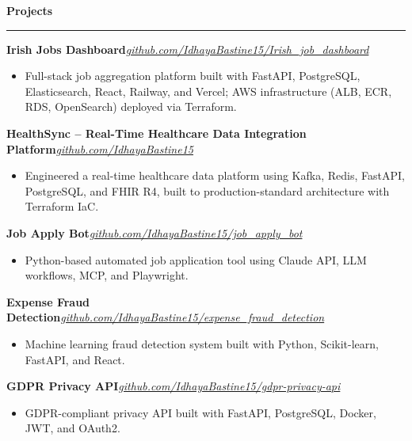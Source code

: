 \documentclass[10pt,letterpaper]{article}
\newcommand{\ressection}[1]{%
  \vspace{4pt}%
  {\large\textbf{#1}}\\[-5pt]%
  \rule{\linewidth}{0.5pt}\par%
  \vspace{2pt}%
}
\newcommand{\jobtitle}[2]{%
  \vspace{3pt}%
  \noindent\textbf{#1}\hfill\textit{#2}\par%
}
\begin{document}
\ressection{Projects}

\jobtitle{Irish Jobs Dashboard}{\href{https://github.com/IdhayaBastine15/Irish_job_dashboard}{github.com/IdhayaBastine15/Irish\_job\_dashboard}}
\begin{itemize}[leftmargin=12pt, label=\textbullet, itemsep=1pt, topsep=0pt, parsep=0pt]
  \item Full-stack job aggregation platform built with FastAPI, PostgreSQL, Elasticsearch, React, Railway, and Vercel; AWS infrastructure (ALB, ECR, RDS, OpenSearch) deployed via Terraform.
\end{itemize}

\vspace{2pt}

\jobtitle{HealthSync -- Real-Time Healthcare Data Integration Platform}{\href{https://github.com/IdhayaBastine15}{github.com/IdhayaBastine15}}
\begin{itemize}[leftmargin=12pt, label=\textbullet, itemsep=1pt, topsep=0pt, parsep=0pt]
  \item Engineered a real-time healthcare data platform using Kafka, Redis, FastAPI, PostgreSQL, and FHIR R4, built to production-standard architecture with Terraform IaC.
\end{itemize}

\vspace{2pt}

\jobtitle{Job Apply Bot}{\href{https://github.com/IdhayaBastine15/job_apply_bot}{github.com/IdhayaBastine15/job\_apply\_bot}}
\begin{itemize}[leftmargin=12pt, label=\textbullet, itemsep=1pt, topsep=0pt, parsep=0pt]
  \item Python-based automated job application tool using Claude API, LLM workflows, MCP, and Playwright.
\end{itemize}

\vspace{2pt}

\jobtitle{Expense Fraud Detection}{\href{https://github.com/IdhayaBastine15/expense_fraud_detection}{github.com/IdhayaBastine15/expense\_fraud\_detection}}
\begin{itemize}[leftmargin=12pt, label=\textbullet, itemsep=1pt, topsep=0pt, parsep=0pt]
  \item Machine learning fraud detection system built with Python, Scikit-learn, FastAPI, and React.
\end{itemize}

\vspace{2pt}

\jobtitle{GDPR Privacy API}{\href{https://github.com/IdhayaBastine15/gdpr-privacy-api}{github.com/IdhayaBastine15/gdpr-privacy-api}}
\begin{itemize}[leftmargin=12pt, label=\textbullet, itemsep=1pt, topsep=0pt, parsep=0pt]
  \item GDPR-compliant privacy API built with FastAPI, PostgreSQL, Docker, JWT, and OAuth2.
\end{itemize}
\end{document}
